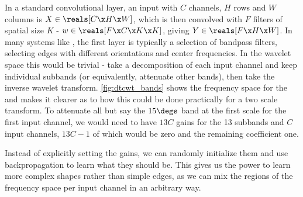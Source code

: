 \begin{figure}[ht]
  \centering
  \hspace{1cm}
  \newline
  \label{fig:dtcwt_bands}
\end{figure}

In a standard convolutional layer, an input with $C$ channels, $H$ rows and $W$
columns is $X \in \reals[C\x H\x W]$, which is then convolved with $F$ filters
of spatial size $K$ - $w \in \reals[F \x C\x K\x K]$, giving $Y \in \reals[F\x
H\x W]$. In many systems like \cite{krizhevsky_imagenet_2012, he_deep_2015}, the
first layer is typically a selection of bandpass filters, selecting edges with
different orientations and center frequencies. In the wavelet space this would
be trivial - take a decomposition of each input channel and keep individual
subbands (or equivalently, attenuate other bands), then take the inverse wavelet
transform.  \autoref{fig:dtcwt_bands} shows the frequency space for the \DTCWT
and makes it clearer as to how this could be done practically for a two scale
transform. To attenuate all but say the $15 \degs$ band at the first scale for
the first input channel, we would need to have $13C$ gains for the 13 subbands
and $C$ input channels, $13C-1$ of which would be zero and the remaining
coefficient one.

Instead of explicitly setting the gains, we can randomly initialize them and use
backpropagation to learn what they should be. This gives us the power to learn
more complex shapes rather than simple edges, as we can mix the regions of the
frequency space per input channel in an arbitrary way. 

